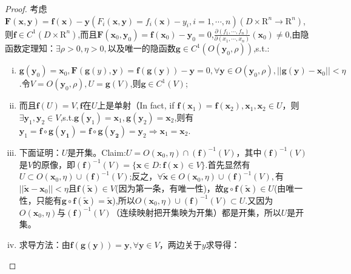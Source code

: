 \documentclass[UTF8]{ctexart}
\newcommand{\p}[2]{\frac{\partial #1}{\partial #2}}
\begin{document}
    \begin{proof}
        考虑$\boldsymbol{F}(\boldsymbol{x},\boldsymbol{y})=\boldsymbol{f}(\boldsymbol{x})-\boldsymbol{y}(F_i(\boldsymbol{x},\boldsymbol{y})=f_i(\boldsymbol{x})-y_i,i=1,\cdots,n)(D\times \mathrm{R}^n\rightarrow \mathrm{R}^n)$,则$\boldsymbol{f}\in C^1(D\times \mathrm{R}^n)$,而且$\boldsymbol{F}(\boldsymbol{x}_0,\boldsymbol{y}_0)=\boldsymbol{f}(\boldsymbol{x}_0)-\boldsymbol{y}_0=0$,$\p{(f_1,\cdots,f_n)}{(x_1,\cdots,x_n)}(\boldsymbol{x}_0)\not=0$,由隐函数定理知：$\exists\rho>0,\eta>0,$以及唯一的隐函数$\boldsymbol{g}\in C^1(O(\boldsymbol{y}_0,\rho))$,s.t.:
        \begin{enumerate}[(i)]
            \item $\boldsymbol{g}(\boldsymbol{y}_0)=\boldsymbol{x}_0,\boldsymbol{F}(\boldsymbol{g}(y),\boldsymbol{y})=\boldsymbol{f}(\boldsymbol{g}(\boldsymbol{y}))-\boldsymbol{y}=0,\forall\boldsymbol{y}\in O(\boldsymbol{y}_0,\rho),||\boldsymbol{g}(\boldsymbol{y})-\boldsymbol{x}_0||<\eta$.令$V=O(\boldsymbol{y}_0,\rho),U=\boldsymbol{g}(V)$,则$\boldsymbol{g}\in C^1(V)$;
            \item 而且$\boldsymbol{f}(U)=V,\boldsymbol{f}$在$U$上是单射（In fact, if $\boldsymbol{f}(\boldsymbol{x}_1)=\boldsymbol{f}(\boldsymbol{x}_2),\boldsymbol{x}_1,\boldsymbol{x}_2\in U$，则$\exists\boldsymbol{y}_1,\boldsymbol{y}_2\in V$,s.t.$\boldsymbol{g}(\boldsymbol{y}_1)=\boldsymbol{x}_1,\boldsymbol{g}(\boldsymbol{y}_2)=\boldsymbol{x}_2$,则有$\boldsymbol{y}_1=\boldsymbol{f}\circ\boldsymbol{g}(\boldsymbol{y_1})=\boldsymbol{f}\circ\boldsymbol{g}(\boldsymbol{y_2})=\boldsymbol{y}_2\Rightarrow \boldsymbol{x}_1=\boldsymbol{x}_2$.
            \item 下面证明：$U$是开集。Claim:$U=O(\boldsymbol{x}_0,\eta)\cap(\boldsymbol{f})^{-1}(V)$，其中$(\boldsymbol{f})^{-1}(V)$是$V$的原像，即$(\boldsymbol{f})^{-1}(V)=\{\boldsymbol{x}\in D:\boldsymbol{f}(\boldsymbol{x})\in V\}$.首先显然有$U\subset O(\boldsymbol{x}_0,\eta)\cup(\boldsymbol{f})^{-1}(V)$;反之，$\forall\tilde{\boldsymbol{x}}\in O(\boldsymbol{x}_0,\eta)\cup(\boldsymbol{f})^{-1}(V),$有$||\tilde{\boldsymbol{x}}-\boldsymbol{x}_0||<\eta$且$\boldsymbol{f}(\tilde{\boldsymbol{x}})\in V$(因为第一条，有唯一性)，故$\boldsymbol{g}\circ\boldsymbol{f}(\tilde{\boldsymbol{x}})\in U$(由唯一性，只能有$\boldsymbol{g}\circ\boldsymbol{f}(\tilde{\boldsymbol{x}})=\tilde{\boldsymbol{x}}$),所以$O(\boldsymbol{x}_0,\eta)\cup(\boldsymbol{f})^{-1}(V)\subset U$.又因为$O(\boldsymbol{x}_0,\eta)$与$(\boldsymbol{f})^{-1}(V)$（连续映射把开集映为开集）都是开集，所以$U$是开集。
            \item 求导方法：由$\boldsymbol{f}(\boldsymbol{g}(\boldsymbol{y}))=\boldsymbol{y},\forall\boldsymbol{y}\in V$，两边关于$y$求导得：

\end{enumerate}
\end{proof}
\end{document}
